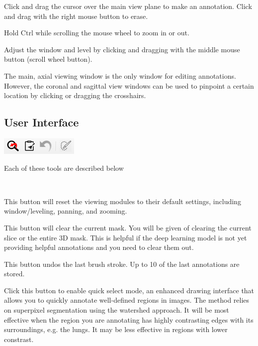 \documentclass[twoside,a4paper]{refart}
\begin{document}
Click and drag the cursor over the main view plane to make an annotation. Click and drag with the right mouse button to erase.

Hold Ctrl while scrolling the mouse wheel to zoom in or out.

Adjust the window and level by clicking and dragging with the middle mouse button (scroll wheel button).

The main, axial viewing window is the only window for editing annotations. However, the coronal and sagittal view windows can be used to pinpoint a certain location by clicking or dragging the crosshairs.


\subsection{User Interface}

\hspace{-1.6in}
\begin{minipage}{1.35\textwidth}
\includegraphics[width=.3\textwidth]{CorrectionsToolbar.PNG}

\normalsize{Each of these tools are described below}
\end{minipage}\\[1em]

\normalsize

This button will reset the viewing modules to their default settings, including window/leveling, panning, and zooming.

This button will clear the current mask. You will be given of clearing the current slice or the entire 3D mask. This is helpful if the deep learning model is not yet providing helpful annotations and you need to clear them out.

This button undos the last brush stroke. Up to 10 of the last annotations are stored.

Click this button to enable quick select mode, an enhanced drawing interface that allows you to quickly annotate well-defined regions in images. The method relies on superpixel segmentation using the watershed approach. It will be most effective when the region you are annotating has highly contrasting edges with its surroundings, e.g. the lungs. It may be less effective in regions with lower constrast.
\end{document}
